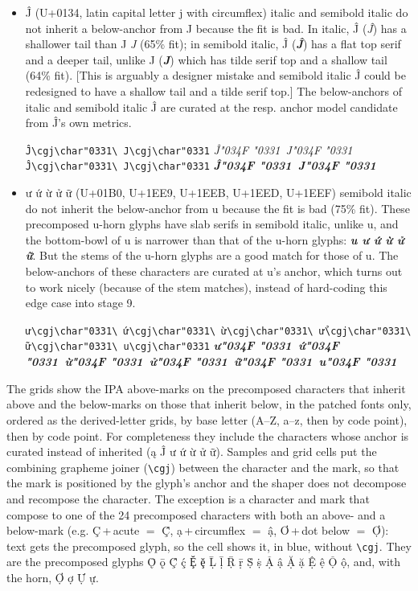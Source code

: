 \documentclass[landscape]{article}
\newcommand{\SUPPORTEDPREC}[1]{{\color{supportedprec}#1}}
\newcommand{\cgj}{\char"034F }
\begin{document}
\begin{itemize}
\verb|ą\cgj\char"0304\ a\cgj\char"0304| {\LibertinusSerifPatch\bfseries ą\cgj\char"0304\ a\cgj\char"0304}
\item Ĵ (U+0134, latin capital letter j with circumflex) italic and semibold italic do not inherit a below-anchor from J because the fit is bad.
In italic, Ĵ ({\itshape Ĵ}) has a shallower tail than J {\itshape J} (65\% fit);
in semibold italic, Ĵ ({\itshape\bfseries Ĵ}) has a flat top serif and a deeper tail, unlike J ({\itshape\bfseries J})
which has tilde serif top and a shallow tail  (64\% fit). 
[This is arguably a designer mistake and semibold italic Ĵ could be redesigned to have a shallow tail and a tilde serif top.]
The below-anchors of italic and semibold italic Ĵ are curated at the resp. anchor model candidate from Ĵ's own metrics.

\verb|Ĵ\cgj\char"0331\ J\cgj\char"0331| {\LibertinusSerifPatch\itshape Ĵ\cgj\char"0331\ J\cgj\char"0331}
\quad
\verb|Ĵ\cgj\char"0331\ J\cgj\char"0331| {\LibertinusSerifPatch\bfseries\itshape Ĵ\cgj\char"0331\ J\cgj\char"0331}
\item  ư ứ ừ ử ữ (U+01B0, U+1EE9, U+1EEB, U+1EED, U+1EEF) semibold italic do not inherit the below-anchor from u 
because the fit is bad (75\% fit).
These precomposed u-horn glyphs have slab serifs in semibold italic, unlike u, and the bottom-bowl of u is narrower than 
that of the u-horn glyphs:
{\itshape\bfseries u ư ứ ừ ử ữ}.
But the stems of the u-horn glyphs are a good match for those of u.
The below-anchors of these characters are curated at u's anchor, which turns out to work nicely (because of the stem matches), 
instead of hard-coding this edge case into stage 9.

\verb|ư\cgj\char"0331\ ứ\cgj\char"0331\ ừ\cgj\char"0331\ ử\cgj\char"0331\ ữ\cgj\char"0331\ u\cgj\char"0331|
{\LibertinusSerifPatch\bfseries\itshape ư\cgj\char"0331\ ứ\cgj\char"0331\ ừ\cgj\char"0331\ ử\cgj\char"0331\ ữ\cgj\char"0331\ u\cgj\char"0331}
\end{itemize}

The grids show the IPA above-marks on the precomposed characters that inherit above and the below-marks on those that inherit below, 
in the patched fonts only, ordered as the derived-letter grids, by base letter (A--Z, a--z, then by code point), then by code point.
For completeness they include the characters whose anchor is curated instead of inherited (ą Ĵ ư ứ ừ ử ữ).
Samples and grid cells put the combining grapheme joiner (\verb|\cgj|) between the character and the mark, 
so that the mark is positioned by the glyph's anchor and the shaper does not decompose and recompose the character.
The exception is a character and mark that compose to one of the 24 precomposed characters with both an above- and a below-mark (e.g. Ç\,+\,acute $=$ Ḉ, ạ\,+\,circumflex $=$ ậ, Ơ\,+\,dot below $=$ Ợ):
text gets the precomposed glyph, so the cell shows it, in \SUPPORTEDPREC{blue}, without \verb|\cgj|.
They are the precomposed glyphs Ǭ ǭ Ḉ ḉ Ḝ ḝ Ḹ ḹ Ṝ ṝ Ṩ ṩ Ậ ậ Ặ ặ Ệ ệ Ộ ộ, and, with the horn, Ợ ợ Ự ự.




\end{document}

